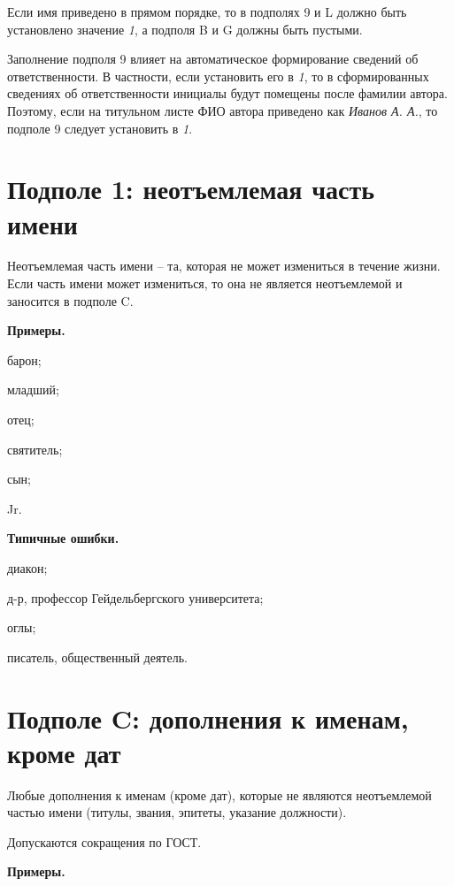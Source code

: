 Если имя приведено в прямом порядке, то в подполях 9 и L должно быть установлено значение \emph{1}, а подполя B и G должны быть пустыми.

Заполнение подполя 9 влияет на автоматическое формирование сведений об ответственности. В частности, если установить его в \emph{1}, то в сформированных сведениях об ответственности инициалы будут помещены после фамилии автора. Поэтому, если на титульном листе ФИО автора приведено как \emph{Иванов А. А.}, то подполе 9 следует установить в \emph{1}.

\section{Подполе 1: неотъемлемая часть имени}

Неотъемлемая часть имени -- та, которая не может измениться в течение жизни. Если часть имени может измениться, то она не является неотъемлемой и заносится в подполе C.

\textbf{Примеры.}

\begin{cutelist}
    \item барон;
    \item младший;
    \item отец;
    \item святитель;
    \item сын;
    \item Jr.
\end{cutelist}

\textbf{Типичные ошибки.}

\begin{cutelist}
    \item диакон;
    \item д-р, профессор Гейдельбергского университета;
    \item оглы;
    \item писатель, общественный деятель.
\end{cutelist}

\section{Подполе C: дополнения к именам, кроме дат}

Любые дополнения к именам (кроме дат), которые не являются неотъемлемой частью имени (титулы, звания, эпитеты, указание должности).

Допускаются сокращения по ГОСТ.

\textbf{Примеры.}


